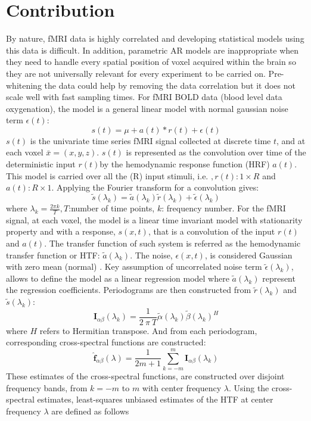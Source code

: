 \documentclass[12pt,twoside]{article}
\begin{document}
\section*{Contribution}
By nature, fMRI data is highly correlated and developing statistical models using this data  is difficult.
In addition, parametric AR models are inappropriate when they need to handle every spatial position of voxel acquired within the brain 
so they are not universally relevant for every experiment to be carried on. 
Pre-whitening the data could help by removing the data correlation but it does not scale well with fast sampling times.
For fMRI BOLD data (blood level data oxygenation), the model is a general linear model with normal gaussian noise term $\epsilon(t)$:
\[
	s(t) = \mu + a(t) * r(t) + \epsilon(t)
\]
$s(t)$ is the univariate time series fMRI signal collected at discrete time $t$, and at each voxel $\bar{x}=(x,y,z)$.
$s(t)$ is represented as the convolution over time of the deterministic input $r(t)$by the hemodynamic response function (HRF) $a(t)$.
This model is carried over all the (R) input stimuli, i.e. $,r(t): 1 \times R$ and $a(t): R \times 1$.
Applying the Fourier transform for a convolution gives:
\[
	\tilde{s}(\lambda_k) = \tilde{a} (\lambda_k) \tilde{r}  (\lambda_k) + \tilde{\epsilon}  (\lambda_k) 
\] where $\lambda_k = \frac{2 \pi k}{T}, T$:number of time points, $k$: frequency number.
For the fMRI signal, at each voxel, the model is a linear time invariant model with stationarity property and with a response,
$s(x,t)$, that is a convolution of the input $r(t)$ and $a(t)$.
The transfer function of such system is referred as the hemodynamic transfer function or HTF: $\tilde{a} (\lambda_k)$.
 The noise, $\epsilon(x,t)$, is considered Gaussian with zero mean (normal) .
 Key assumption of uncorrelated noise term $\tilde{\epsilon}  (\lambda_k)$, allows to define the model as a linear regression model
where $\tilde{a} (\lambda_k)$ represent the regression coefficients.
Periodograms are then constructed from $ \tilde{r}  (\lambda_k)$ and $\tilde{s}(\lambda_k)$:
\[
	\textbf{I}_{\alpha\beta}(\lambda_k) = \frac{1}{2~\pi~T} \tilde{\alpha}(\lambda_k) \tilde{\beta}(\lambda_k)^H
\]
where $H$ refers to Hermitian transpose. And from each periodogram, corresponding cross-spectral functions are constructed:
\[
	\hat{\textbf{f}}_{\alpha\beta}(\lambda) = \frac{1}{2m+1} \sum_{k=-m}^m \textbf{I}_{\alpha\beta}(\lambda_k) 
\]
These estimates of the cross-spectral functions, are constructed over disjoint frequency bands, from $k=-m$ to $m$ with center frequency $\lambda$.
Using the cross-spectral estimates, least-squares unbiased estimates of the HTF at center frequency $\lambda$ are defined as follows
\end{document}
